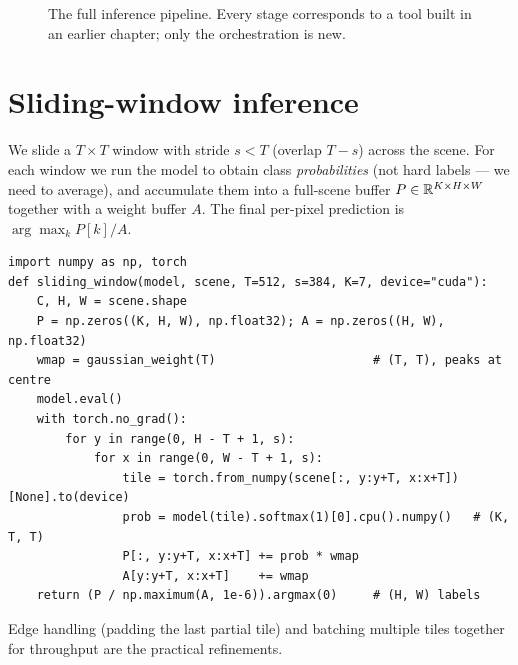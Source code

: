 \begin{figure}[h]
\centering
{}
\caption{The full inference pipeline. Every stage corresponds to a tool built in
an earlier chapter; only the orchestration is new.}
\label{fig:pipe}
\end{figure}

\section{Sliding-window inference}

We slide a $T\times T$ window with stride $s<T$ (overlap $T-s$) across the
scene. For each window we run the model to obtain class \emph{probabilities}
(not hard labels --- we need to average), and accumulate them into a full-scene
buffer $P\in\mathbb{R}^{K\times H\times W}$ together with a weight buffer $A$. The final
per-pixel prediction is $\arg\max_k P[k]/A$.
\begin{lstlisting}
import numpy as np, torch
def sliding_window(model, scene, T=512, s=384, K=7, device="cuda"):
    C, H, W = scene.shape
    P = np.zeros((K, H, W), np.float32); A = np.zeros((H, W), np.float32)
    wmap = gaussian_weight(T)                      # (T, T), peaks at centre
    model.eval()
    with torch.no_grad():
        for y in range(0, H - T + 1, s):
            for x in range(0, W - T + 1, s):
                tile = torch.from_numpy(scene[:, y:y+T, x:x+T])[None].to(device)
                prob = model(tile).softmax(1)[0].cpu().numpy()   # (K, T, T)
                P[:, y:y+T, x:x+T] += prob * wmap
                A[y:y+T, x:x+T]    += wmap
    return (P / np.maximum(A, 1e-6)).argmax(0)     # (H, W) labels
\end{lstlisting}
Edge handling (padding the last partial tile) and batching multiple tiles
together for throughput are the practical refinements.

